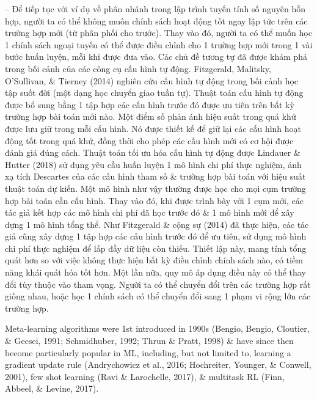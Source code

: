 \documentclass{article}
\begin{document}
\begin{itemize}
\begin{itemize}
        -- Để tiếp tục với ví dụ về phân nhánh trong lập trình tuyến tính số nguyên hỗn hợp, người ta có thể không muốn chính sách hoạt động tốt ngay lập tức trên các trường hợp mới (từ phân phối cho trước). Thay vào đó, người ta có thể muốn học 1 chính sách ngoại tuyến có thể được điều chỉnh cho 1 trường hợp mới trong 1 vài bước huấn luyện, mỗi khi được đưa vào. Các chủ đề tương tự đã được khám phá trong bối cảnh của các công cụ cấu hình tự động. Fitzgerald, Malitsky, O'Sullivan, \& Tierney (2014) nghiên cứu cấu hình tự động trong bối cảnh học tập suốt đời (một dạng học chuyển giao tuần tự). Thuật toán cấu hình tự động được bổ sung bằng 1 tập hợp các cấu hình trước đó được ưu tiên trên bất kỳ trường hợp bài toán mới nào. Một điểm số phản ánh hiệu suất trong quá khứ được lưu giữ trong mỗi cấu hình. Nó được thiết kế để giữ lại các cấu hình hoạt động tốt trong quá khứ, đồng thời cho phép các cấu hình mới có cơ hội được đánh giá đúng cách. Thuật toán tối ưu hóa cấu hình tự động được Lindauer \& Hutter (2018) sử dụng yêu cầu huấn luyện 1 mô hình chi phí thực nghiệm, ánh xạ tích Descartes của các cấu hình tham số \& trường hợp bài toán với hiệu suất thuật toán dự kiến. Một mô hình như vậy thường được học cho mọi cụm trường hợp bài toán cần cấu hình. Thay vào đó, khi được trình bày với 1 cụm mới, các tác giả kết hợp các mô hình chi phí đã học trước đó \& 1 mô hình mới để xây dựng 1 mô hình tổng thể. Như Fitzgerald \& cộng sự (2014) đã thực hiện, các tác giả cũng xây dựng 1 tập hợp các cấu hình trước đó để ưu tiên, sử dụng mô hình chi phí thực nghiệm để lấp đầy dữ liệu còn thiếu. Thiết lập này, mang tính tổng quát hơn so với việc không thực hiện bất kỳ điều chỉnh chính sách nào, có tiềm năng khái quát hóa tốt hơn. Một lần nữa, quy mô áp dụng điều này có thể thay đổi tùy thuộc vào tham vọng. Người ta có thể chuyển đổi trên các trường hợp rất giống nhau, hoặc học 1 chính sách có thể chuyển đổi sang 1 phạm vi rộng lớn các trường hợp.

        Meta-learning algorithms were 1st introduced in 1990s (Bengio, Bengio, Cloutier, \& Gecsei, 1991; Schmidhuber, 1992; Thrun \& Pratt, 1998) \& have since then become particularly popular in ML, including, but not limited to, learning a gradient update rule (Andrychowicz et al., 2016; Hochreiter, Younger, \& Conwell, 2001), few shot learning (Ravi \& Larochelle, 2017), \& multitask RL (Finn, Abbeel, \& Levine, 2017).


\end{itemize}
\end{itemize}
\end{document}
